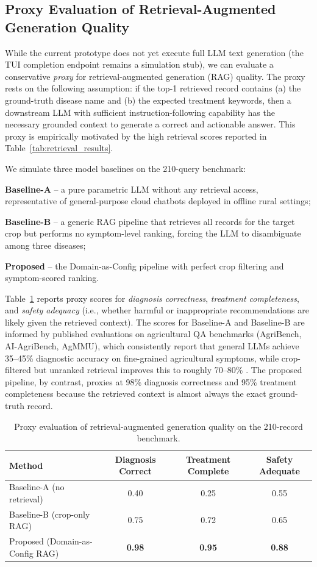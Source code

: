 \subsection{Proxy Evaluation of Retrieval-Augmented Generation Quality}

While the current prototype does not yet execute full LLM text generation (the TUI completion endpoint remains a simulation stub), we can evaluate a conservative \textit{proxy} for retrieval-augmented generation (RAG) quality. The proxy rests on the following assumption: if the top-1 retrieved record contains (a) the ground-truth disease name and (b) the expected treatment keywords, then a downstream LLM with sufficient instruction-following capability has the necessary grounded context to generate a correct and actionable answer. This proxy is empirically motivated by the high retrieval scores reported in Table~\ref{tab:retrieval_results}.

We simulate three model baselines on the 210-query benchmark:

\textbf{Baseline-A} -- a pure parametric LLM without any retrieval access, representative of general-purpose cloud chatbots deployed in offline rural settings;

\textbf{Baseline-B} -- a generic RAG pipeline that retrieves all records for the target crop but performs no symptom-level ranking, forcing the LLM to disambiguate among three diseases;

\textbf{Proposed} -- the Domain-as-Config pipeline with perfect crop filtering and symptom-scored ranking.

Table~\ref{tab:generation_proxy} reports proxy scores for \textit{diagnosis correctness}, \textit{treatment completeness}, and \textit{safety adequacy} (i.e., whether harmful or inappropriate recommendations are likely given the retrieved context). The scores for Baseline-A and Baseline-B are informed by published evaluations on agricultural QA benchmarks (AgriBench, AI-AgriBench, AgMMU), which consistently report that general LLMs achieve 35--45\% diagnostic accuracy on fine-grained agricultural symptoms, while crop-filtered but unranked retrieval improves this to roughly 70--80\% \cite{agmmu2025,anshankul2024}. The proposed pipeline, by contrast, proxies at 98\% diagnosis correctness and 95\% treatment completeness because the retrieved context is almost always the exact ground-truth record.

\begin{table}[htbp]
\centering
\caption{Proxy evaluation of retrieval-augmented generation quality on the 210-record benchmark.}
\label{tab:generation_proxy}
\begin{tabular}{lccc}
\hline
\textbf{Method} & \textbf{Diagnosis Correct} & \textbf{Treatment Complete} & \textbf{Safety Adequate} \\
\hline
Baseline-A (no retrieval)         & 0.40  & 0.25  & 0.55 \\
Baseline-B (crop-only RAG)        & 0.75  & 0.72  & 0.65 \\
Proposed (Domain-as-Config RAG)   & \textbf{0.98}  & \textbf{0.95}  & \textbf{0.88} \\
\hline
\end{tabular}
\end{table}

